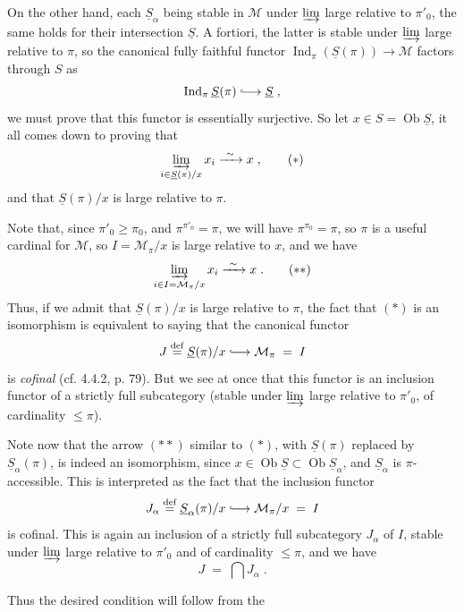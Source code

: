 \documentclass[11pt]{article}
\newcommand{\printedpage}[1]{\marginpar{\footnotesize p.~#1}}
\newcommand{\msp}[1]{\marginpar{\footnotesize [#1]}}
\newcommand{\incl}{\lhook\joinrel\longrightarrow}
\newcommand{\Ob}{\operatorname{Ob}}
\newcommand{\Ind}{\operatorname{Ind}}
\begin{document}
\printedpage{109}

On the other hand, each $\underline{S}_\alpha$ being stable in $\mathcal{M}$ under $\varinjlim$ large relative to $\pi'_0$, the same holds for their intersection $\underline{S}$. A fortiori, the latter is stable under $\varinjlim$ large relative to $\pi$, so the canonical fully faithful functor $\Ind_\pi(\underline{S}(\pi))\longrightarrow\mathcal{M}$ factors through $S$ as
\[ \Ind_\pi\underline{S}(\pi) \incl \underline{S} \; , \]
we must prove that this functor is essentially surjective. So let $x\in S=\Ob\underline{S}$, it all comes down to proving that
\[ \varinjlim_{i\in\underline{S}(\pi)/x} x_i \xrightarrow{\ \sim\ } x \; , \tag*{$(*)$} \]
and that $\underline{S}(\pi)/x$ is large relative to $\pi$.

Note that, since $\pi'_0\geqslant\pi_0$, and $\pi^{\pi'_0}=\pi$, we will have $\pi^{\pi_0}=\pi$, so $\pi$ is a useful cardinal for $\mathcal{M}$, so $I=\mathcal{M}_\pi/x$ is large relative to $x$, and we have %
\[ \varinjlim_{i\in I=\mathcal{M}_\pi/x} x_i \xrightarrow{\ \sim\ } x \; . \tag*{$(**)$} \]
Thus, if we admit that $\underline{S}(\pi)/x$ is large relative to $\pi$,
\msp{page 294}
the fact that $(*)$ is an isomorphism is equivalent to saying that the canonical functor
\[ J \overset{\text{def}}{=} \underline{S}(\pi)/x \incl \mathcal{M}_\pi \; = \; I \] %
is \textit{cofinal} (cf. 4.4.2, p. 79). But we see at once that this functor is an inclusion functor of a strictly full subcategory (stable under $\varinjlim$ large relative to $\pi'_0$, of cardinality $\leqslant\pi$).

Note now that the arrow $(**)$ similar to $(*)$, with $\underline{S}(\pi)$ replaced by $\underline{S}_\alpha(\pi)$, is indeed an isomorphism, since $x\in\Ob\underline{S}\subset\Ob\underline{S}_\alpha$, and $\underline{S}_\alpha$ is $\pi$-accessible. This is interpreted as the fact that the inclusion functor
\[ J_\alpha \overset{\text{def}}{=} \underline{S}_\alpha(\pi)/x \incl \mathcal{M}_\pi/x \; = \; I \]
is cofinal. This is again an inclusion of a strictly full subcategory $J_\alpha$ of $I$, stable under $\varinjlim$ large relative to $\pi'_0$ and of cardinality $\leqslant\pi$, and we have
\[ J \; = \; \bigcap J_\alpha \; . \]

Thus the desired condition will follow from the
\msp{page 295}
\end{document}
